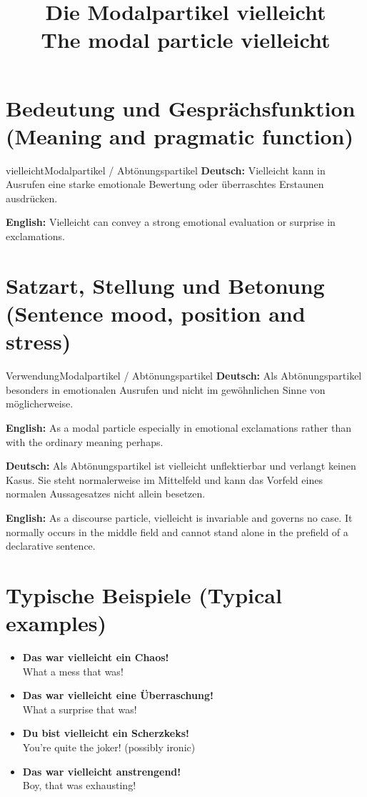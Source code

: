 \documentclass[a4paper,11pt]{article}
\title{Die Modalpartikel \glqq vielleicht\grqq\\{\large\textnormal{The modal particle vielleicht}}}
\date{}
\newcommand{\GermanText}[1]{\textbf{Deutsch: }#1\par}
\newcommand{\EnglishText}[1]{{\small\color{SoftGray}\textbf{English: }#1\par}}
\newcommand{\ExampleItem}[2]{\item \textbf{#1}\\{\small\color{SoftGray}#2}}
\begin{document}
\maketitle
\tableofcontents
\section{Bedeutung und Gesprächsfunktion \textnormal{(Meaning and pragmatic function)}}
\begin{grammarentry}{vielleicht}{Modalpartikel / Abtönungspartikel}
\GermanText{Vielleicht kann in Ausrufen eine starke emotionale Bewertung oder überraschtes Erstaunen ausdrücken.}
\EnglishText{Vielleicht can convey a strong emotional evaluation or surprise in exclamations.}
\end{grammarentry}
\section{Satzart, Stellung und Betonung \textnormal{(Sentence mood, position and stress)}}
\begin{grammarentry}{Verwendung}{Modalpartikel / Abtönungspartikel}
\GermanText{Als Abtönungspartikel besonders in emotionalen Ausrufen und nicht im gewöhnlichen Sinne von möglicherweise.}
\EnglishText{As a modal particle especially in emotional exclamations rather than with the ordinary meaning perhaps.}
\end{grammarentry}
\GermanText{Als Abtönungspartikel ist vielleicht unflektierbar und verlangt keinen Kasus. Sie steht normalerweise im Mittelfeld und kann das Vorfeld eines normalen Aussagesatzes nicht allein besetzen.}
\EnglishText{As a discourse particle, vielleicht is invariable and governs no case. It normally occurs in the middle field and cannot stand alone in the prefield of a declarative sentence.}
\section{Typische Beispiele \textnormal{(Typical examples)}}
\begin{exbox}\begin{itemize}
\ExampleItem{Das war vielleicht ein Chaos!}{What a mess that was!}
\ExampleItem{Das war vielleicht eine Überraschung!}{What a surprise that was!}
\ExampleItem{Du bist vielleicht ein Scherzkeks!}{You're quite the joker! (possibly ironic)}
\ExampleItem{Das war vielleicht anstrengend!}{Boy, that was exhausting!}
\end{itemize}\end{exbox}
\end{document}
